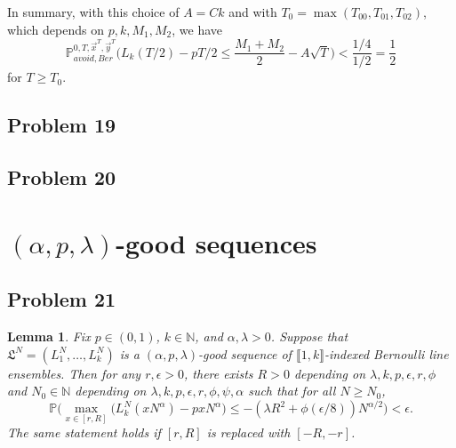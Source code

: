 \documentclass[12pt]{article}
\newtheorem{lemma}{Lemma}
\begin{document}
	In summary, with this choice of $A = Ck$ and with $T_0 = \max(T_{00}, T_{01}, T_{02})$, which depends on $p,k,M_1,M_2$, we have
	\[
	\mathbb{P}^{0,T,\vec{x}^T,\vec{y}^T}_{avoid, Ber} \Big( L_k(T/2) - pT/2 \leq \frac{M_1+M_2}{2} - A\sqrt{T} \Big) < \frac{1/4}{1/2} = \frac{1}{2}
	\]
	for $T\geq T_0$. 
	


\subsection*{Problem 19}


\subsection*{Problem 20}


\section{$(\alpha, p, \lambda)$-good sequences}

\subsection*{Problem 21}

	\begin{lemma}
		Fix $p\in (0,1)$, $k\in\mathbb{N}$, and $\alpha,\lambda > 0$. Suppose that $\mathfrak{L}^N = (L_1^N, \dots, L_k^N)$ is a $(\alpha,p,\lambda)$-good sequence of $\llbracket 1, k\rrbracket$-indexed Bernoulli line ensembles. Then for any $r,\epsilon>0$, there exists $R>0$ depending on $\lambda,k,p,\epsilon,r,\phi$ and $N_0 \in \mathbb{N}$ depending on $\lambda,k,p,\epsilon,r,\phi,\psi,\alpha$ such that for all $N\geq N_0$,
		\[
		\mathbb{P}\Big(\max_{x\in[r,R]} \big(L_k^N(xN^\alpha) - pxN^\alpha\big) \leq -(\lambda R^2 + \phi(\epsilon/8))N^{\alpha/2}\Big) < \epsilon.
		\]
		The same statement holds if $[r,R]$ is replaced with $[-R,-r]$.
	\end{lemma}
\end{document}
